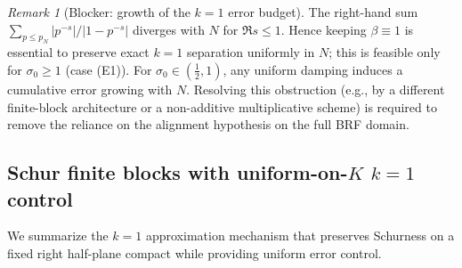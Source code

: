 \documentclass[11pt]{article}
\theoremstyle{definition}
\theoremstyle{remark}
\newtheorem{remark}[theorem]{Remark}
\begin{document}
\begin{remark}[Blocker: growth of the $k=1$ error budget]
The right-hand sum $\sum_{p\le p_N} |p^{-s}|/|1-p^{-s}|$ diverges with $N$ for $\Re s\le 1$. Hence keeping $\beta\equiv 1$ is essential to preserve exact $k=1$ separation uniformly in $N$; this is feasible only for $\sigma_0\ge 1$ (case (E1)). For $\sigma_0\in(\tfrac12,1)$, any uniform damping induces a cumulative error growing with $N$. Resolving this obstruction (e.g., by a different finite-block architecture or a non-additive multiplicative scheme) is required to remove the reliance on the alignment hypothesis on the full BRF domain.
\end{remark}

\subsection{Schur finite blocks with uniform-on-$K$ $k=1$ control}\label{subsec:K1-approx}
We summarize the $k=1$ approximation mechanism that preserves Schurness on a fixed right half-plane compact while providing uniform error control.
\end{document}
